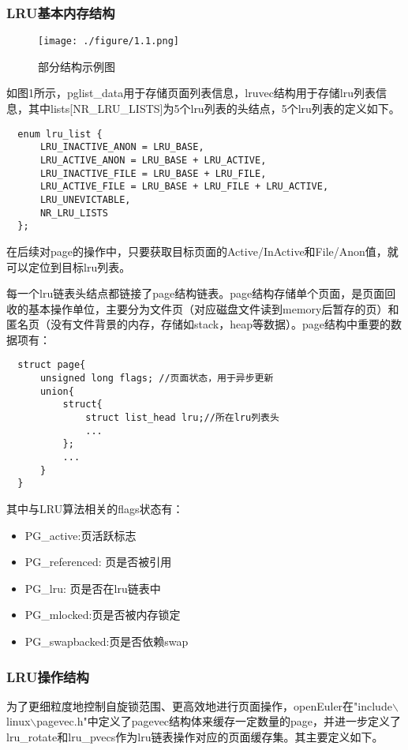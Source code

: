 \documentclass[11pt, a4paper, oneside,UTF8]{ctexart}
\begin{document}
\subsubsection{LRU基本内存结构}
\begin{figure}[ht]
    \centering
    \texttt{[image: ./figure/1.1.png]}
    \caption{部分结构示例图}
    \label{figure:1.1}
\end{figure}

如图1所示，pglist\_data用于存储页面列表信息，lruvec结构用于存储lru列表信息，其中lists[NR\_LRU\_LISTS]为5个lru列表的头结点，5个lru列表的定义如下。
\begin{lstlisting}
  enum lru_list {
      LRU_INACTIVE_ANON = LRU_BASE,
      LRU_ACTIVE_ANON = LRU_BASE + LRU_ACTIVE,
      LRU_INACTIVE_FILE = LRU_BASE + LRU_FILE,
      LRU_ACTIVE_FILE = LRU_BASE + LRU_FILE + LRU_ACTIVE,
      LRU_UNEVICTABLE,
      NR_LRU_LISTS
  };
\end{lstlisting}
在后续对page的操作中，只要获取目标页面的Active/InActive和File/Anon值，就可以定位到目标lru列表。

每一个lru链表头结点都链接了page结构链表。page结构存储单个页面，是页面回收的基本操作单位，主要分为文件页（对应磁盘文件读到memory后暂存的页）和匿名页（没有文件背景的内存，存储如stack，heap等数据）。page结构中重要的数据项有：
\begin{lstlisting}
  struct page{
      unsigned long flags; //页面状态，用于异步更新
      union{
          struct{
              struct list_head lru;//所在lru列表头
              ...
          };
          ...
      }
  }
\end{lstlisting}
其中与LRU算法相关的flags状态有：
\begin{itemize}
  \setlength{\itemsep}{-0.5em}
  \item PG\_active:页活跃标志
  \item PG\_referenced: 页是否被引用
  \item PG\_lru: 页是否在lru链表中
  \item PG\_mlocked:页是否被内存锁定
  \item PG\_swapbacked:页是否依赖swap
\end{itemize}

\subsubsection{LRU操作结构}

为了更细粒度地控制自旋锁范围、更高效地进行页面操作，openEuler在"include$\backslash$linux$\backslash$pagevec.h"中定义了pagevec结构体来缓存一定数量的page，并进一步定义了lru\_rotate和lru\_pvecs作为lru链表操作对应的页面缓存集。其主要定义如下。
\end{document}
